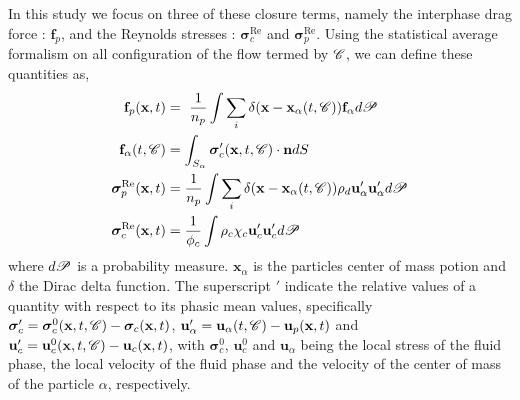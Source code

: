In this study we focus on three of these closure terms, namely the interphase drag force : $\textbf{f}_p$, and the Reynolds stresses : $\bm{\sigma}^{\text{Re}}_c$ and $\bm{\sigma}^{\text{Re}}_p$. 
Using the statistical average formalism on all configuration of the flow termed by $\mathscr{C}$, we can define these quantities as,  
\begin{align}
    \textbf{f}_p (\textbf{x},t) &= \
    \frac{1}{n_p}\int \sum_i \delta(\textbf{x} - \textbf{x}_\alpha(t,\mathscr{C})) \textbf{f}_\alpha d\mathscr{P}\\
    \textbf{f}_\alpha(t,\mathscr{C}) &= \int_{S_\alpha} \bm{\sigma}_c'(\textbf{x},t,\mathscr{C}) \cdot \textbf{n} dS \\
    \bm{\sigma}^{\text{Re}}_p(\textbf{x},t) &=\frac{1}{n_p} \int \sum_i \delta(\textbf{x} - \textbf{x}_\alpha(t,\mathscr{C})) \rho_d \textbf{u}_\alpha'\textbf{u}_\alpha' d\mathscr{P}\\
    \label{eq:def_uuc}
    \bm{\sigma}^{\text{Re}}_c(\textbf{x},t) &= \frac{1}{\phi_c}\int \rho_c\chi_c \textbf{u}_c' \textbf{u}_c'd\mathscr{P}
\end{align}
where $d\mathscr{P}$ is a probability measure. 
$\textbf{x}_\alpha$ is the particles center of mass potion and $\delta$ the Dirac delta function. 
The superscript $'$ indicate the relative values of a quantity with respect to its phasic mean values, specifically $\bm{\sigma}_c' = \bm{\sigma}_c^0(\textbf{x},t, \mathscr{C})  - \bm{\sigma}_c(\textbf{x},t)$, $\textbf{u}_\alpha' = \textbf{u}_\alpha(t,\mathscr{C}) - \textbf{u}_p(\textbf{x},t)$ and $\textbf{u}_c' = \textbf{u}_c^0(\textbf{x},t, \mathscr{C})  -\textbf{u}_c(\textbf{x},t)$, with $\bm{\sigma}_c^0 $, $\textbf{u}_c^0$ and $\textbf{u}_\alpha$ being the local stress of the fluid phase, the local velocity of the fluid phase and the velocity of the center of mass of the particle $\alpha$, respectively. 





